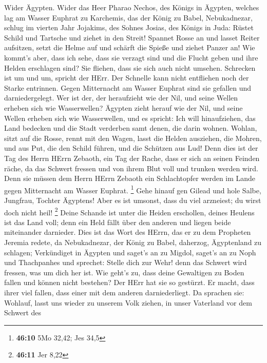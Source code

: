  Wider Ägypten. Wider das Heer Pharao Nechos, des Königs in
Ägypten, welches lag am Wasser Euphrat zu Karchemis, das der König zu
Babel, Nebukadnezar, schlug im vierten Jahr Jojakims, des Sohnes Josias,
des Königs in Juda:  Rüstet Schild und Tartsche und ziehet
in den Streit!  Spannet Rosse an und lasset Reiter
aufsitzen, setzt die Helme auf und schärft die Spieße und ziehet Panzer
an!  Wie kommt's aber, dass ich sehe, dass sie verzagt sind
und die Flucht geben und ihre Helden erschlagen sind? Sie fliehen, dass
sie sich auch nicht umsehen. Schrecken ist um und um, spricht der HErr.
 Der Schnelle kann nicht entfliehen noch der Starke
entrinnen. Gegen Mitternacht am Wasser Euphrat sind sie gefallen und
darniedergelegt.  Wer ist der, der heraufzieht wie der Nil,
und seine Wellen erheben sich wie Wasserwellen?  Ägypten
zieht herauf wie der Nil, und seine Wellen erheben sich wie
Wasserwellen, und es spricht: Ich will hinaufziehen, das Land bedecken
und die Stadt verderben samt denen, die darin wohnen. 
Wohlan, sitzt auf die Rosse, rennt mit den Wagen, lasst die Helden
ausziehen, die Mohren, und aus Put, die den Schild führen, und die
Schützen aus Lud!  Denn dies ist der Tag des Herrn HErrn
Zebaoth, ein Tag der Rache, dass er sich an seinen Feinden räche, da das
Schwert fressen und von ihrem Blut voll und trunken werden wird. Denn
sie müssen dem Herrn HErrn Zebaoth ein Schlachtopfer werden im Lande
gegen Mitternacht am Wasser Euphrat. \footnote{\textbf{46:10} 5Mo 32,42;
  Jes 34,5}  Gehe hinauf gen Gilead und hole Salbe,
Jungfrau, Tochter Ägyptens! Aber es ist umsonst, dass du viel arzneiest;
du wirst doch nicht heil! \footnote{\textbf{46:11} Jer 8,22}
 Deine Schande ist unter die Heiden erschollen, deines
Heulens ist das Land voll; denn ein Held fällt über den anderen und
liegen beide miteinander darnieder.  Dies ist das Wort des
HErrn, das er zu dem Propheten Jeremia redete, da Nebukadnezar, der
König zu Babel, daherzog, Ägyptenland zu schlagen; 
Verkündiget in Ägypten und saget's an zu Migdol, saget's an zu Noph und
Thachpanhes und sprechet: Stelle dich zur Wehr! denn das Schwert wird
fressen, was um dich her ist.  Wie geht's zu, dass deine
Gewaltigen zu Boden fallen und können nicht bestehen? Der HErr hat sie
so gestürzt.  Er macht, dass ihrer viel fallen, dass einer
mit dem anderen darniederliegt. Da sprachen sie: Wohlauf, lasst uns
wieder zu unserem Volk ziehen, in unser Vaterland vor dem Schwert des
